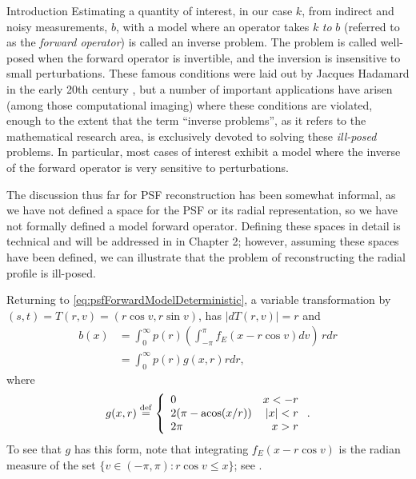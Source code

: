 \begin{chapter}{Introduction}
  Estimating a quantity of interest, in our case $k$, from indirect and noisy measurements, $b$, with a model where an operator takes $k$ \emph{to} $b$ (referred to as the \emph{forward operator}) is called an inverse problem.  
  The problem is called well-posed when the forward operator is invertible, and the inversion is insensitive to small perturbations.
  These famous conditions were laid out by Jacques Hadamard in the early 20th century \citep{hadamard1902}, but a number of important applications have arisen (among those computational imaging) where these conditions are violated, enough to the extent that the term ``inverse problems'', as it refers to the mathematical research area, is exclusively devoted to solving these \emph{ill-posed} problems.
  In particular, most cases of interest %
  exhibit a model where the inverse of the forward operator is very sensitive to perturbations.

  The discussion thus far for PSF reconstruction has been somewhat informal, as we have not defined a space for the PSF or its radial representation, so we have not formally defined a model forward operator.
  Defining these spaces in detail is technical and will be addressed in in Chapter 2; however, assuming these spaces have been defined, we can illustrate that the problem of reconstructing the radial profile is ill-posed.

  Returning to \eqref{eq:psfForwardModelDeterministic}, a variable transformation
  by $(s,t) = T(r,v) = (r\cos v,r\sin v)$, has $|dT(r,v)| = r$ and 
  \begin{align}
    b(x) &= \int_0^\infty p(r) \left( \int_{-\pi}^\pi f_E(x - r\cos v)dv \right)\,r dr\nonumber \\
         &= \int_0^\infty p(r) g(x,r) r dr, \label{eq:radialForwardModelDeterministic}
  \end{align}
where
\begin{equation} \label{eq:radialForwardKernel}
  g(x,r) \stackrel{\rm def}{=} \left\{\begin{array}{lr}
    0 & x < - r\\
    2(\pi - \operatorname*{acos}(x/r)) & |x| < r\\
    2\pi &  x> r
  \end{array}\right..  
\end{equation}
  To see that $g$ has this form, note that integrating $f_E(x-r\cos v)$ is the radian measure of the set $\{v\in(-\pi,\pi): r\cos v \le x\}$; see .  


\end{chapter}
